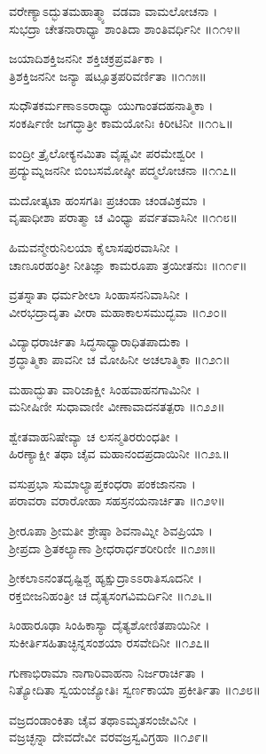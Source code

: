 ವರೇಣ್ಯಾಽದ್ಭುತಮಹಾತ್ಮ್ಯಾ ವಡವಾ ವಾಮಲೋಚನಾ ।\\
ಸುಭದ್ರಾ ಚೇತನಾರಾಧ್ಯಾ ಶಾಂತಿದಾ ಶಾಂತಿವರ್ಧಿನೀ ॥೧೧೪॥

ಜಯಾದಿಶಕ್ತಿಜನನೀ ಶಕ್ತಿಚಕ್ರಪ್ರವರ್ತಿಕಾ ।\\
ತ್ರಿಶಕ್ತಿಜನನೀ ಜನ್ಯಾ ಷಟ್ಸೂತ್ರಪರಿವರ್ಣಿತಾ ॥೧೧೫॥

ಸುಧೌತಕರ್ಮಣಾಽಽರಾಧ್ಯಾ ಯುಗಾಂತದಹನಾತ್ಮಿಕಾ ।\\
ಸಂಕರ್ಷಿಣೀ ಜಗದ್ಧಾತ್ರೀ ಕಾಮಯೋನಿಃ ಕಿರೀಟಿನೀ ॥೧೧೬॥

ಐಂದ್ರೀ ತ್ರೈಲೋಕ್ಯನಮಿತಾ ವೈಷ್ಣವೀ ಪರಮೇಶ್ವರೀ ।\\
ಪ್ರದ್ಯುಮ್ನಜನನೀ ಬಿಂಬಸಮೋಷ್ಠೀ ಪದ್ಮಲೋಚನಾ ॥೧೧೭॥

ಮದೋತ್ಕಟಾ ಹಂಸಗತಿಃ ಪ್ರಚಂಡಾ ಚಂಡವಿಕ್ರಮಾ ।\\
ವೃಷಾಧೀಶಾ ಪರಾತ್ಮಾ ಚ ವಿಂಧ್ಯಾ ಪರ್ವತವಾಸಿನೀ ॥೧೧೮॥

ಹಿಮವನ್ಮೇರುನಿಲಯಾ ಕೈಲಾಸಪುರವಾಸಿನೀ ।\\
ಚಾಣೂರಹಂತ್ರೀ ನೀತಿಜ್ಞಾ ಕಾಮರೂಪಾ ತ್ರಯೀತನುಃ ॥೧೧೯॥

ವ್ರತಸ್ನಾತಾ ಧರ್ಮಶೀಲಾ ಸಿಂಹಾಸನನಿವಾಸಿನೀ ।\\
ವೀರಭದ್ರಾದೃತಾ ವೀರಾ ಮಹಾಕಾಲಸಮುದ್ಭವಾ ॥೧೨೦॥

ವಿದ್ಯಾಧರಾರ್ಚಿತಾ ಸಿದ್ಧಸಾಧ್ಯಾರಾಧಿತಪಾದುಕಾ ।\\
ಶ್ರದ್ಧಾತ್ಮಿಕಾ ಪಾವನೀ ಚ ಮೋಹಿನೀ ಅಚಲಾತ್ಮಿಕಾ ॥೧೨೧॥

ಮಹಾದ್ಭುತಾ ವಾರಿಜಾಕ್ಷೀ ಸಿಂಹವಾಹನಗಾಮಿನೀ ।\\
ಮನೀಷಿಣೀ ಸುಧಾವಾಣೀ ವೀಣಾವಾದನತತ್ಪರಾ ॥೧೨೨॥

ಶ್ವೇತವಾಹನಿಷೇವ್ಯಾ ಚ ಲಸನ್ಮತಿರರುಂಧತೀ ।\\
ಹಿರಣ್ಯಾಕ್ಷೀ ತಥಾ ಚೈವ ಮಹಾನಂದಪ್ರದಾಯಿನೀ ॥೧೨೩॥

ವಸುಪ್ರಭಾ ಸುಮಾಲ್ಯಾಪ್ತಕಂಧರಾ ಪಂಕಜಾನನಾ ।\\
ಪರಾವರಾ ವರಾರೋಹಾ ಸಹಸ್ರನಯನಾರ್ಚಿತಾ ॥೧೨೪॥

ಶ್ರೀರೂಪಾ ಶ್ರೀಮತೀ ಶ್ರೇಷ್ಠಾ ಶಿವನಾಮ್ನೀ ಶಿವಪ್ರಿಯಾ ।\\
ಶ್ರೀಪ್ರದಾ ಶ್ರಿತಕಲ್ಯಾಣಾ ಶ್ರೀಧರಾರ್ಧಶರೀರಿಣೀ ॥೧೨೫॥

ಶ್ರೀಕಲಾಽನಂತದೃಷ್ಟಿಶ್ಚ ಹ್ಯಕ್ಷುದ್ರಾಽಽರಾತಿಸೂದನೀ ।\\
ರಕ್ತಬೀಜನಿಹಂತ್ರೀ ಚ ದೈತ್ಯಸಂಗವಿಮರ್ದಿನೀ ॥೧೨೬॥

ಸಿಂಹಾರೂಢಾ ಸಿಂಹಿಕಾಸ್ಯಾ ದೈತ್ಯಶೋಣಿತಪಾಯಿನೀ ।\\
ಸುಕೀರ್ತಿಸಹಿತಾಚ್ಛಿನ್ನಸಂಶಯಾ ರಸವೇದಿನೀ ॥೧೨೭॥

ಗುಣಾಭಿರಾಮಾ ನಾಗಾರಿವಾಹನಾ ನಿರ್ಜರಾರ್ಚಿತಾ ।\\
ನಿತ್ಯೋದಿತಾ ಸ್ವಯಂಜ್ಯೋತಿಃ ಸ್ವರ್ಣಕಾಯಾ ಪ್ರಕೀರ್ತಿತಾ ॥೧೨೮॥

ವಜ್ರದಂಡಾಂಕಿತಾ ಚೈವ ತಥಾಽಮೃತಸಂಜೀವಿನೀ ।\\
ವಜ್ರಚ್ಛನ್ನಾ ದೇವದೇವೀ ವರವಜ್ರಸ್ವವಿಗ್ರಹಾ ॥೧೨೯॥


